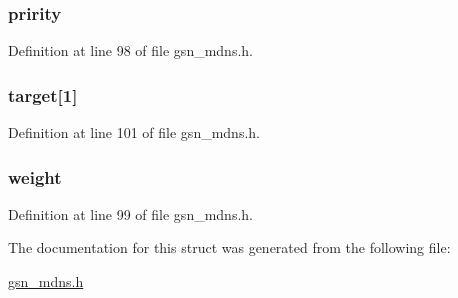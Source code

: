 \hypertarget{a00016_a0e59088092c18a68163f7fee796aaae3}{
\subsubsection[{pririty}]{ {\bf pririty}}}
\label{a00016_a0e59088092c18a68163f7fee796aaae3}


Definition at line 98 of file gsn\_\-mdns.h.

\hypertarget{a00016_a10cc4b5db91d7a9547453a566067ba1e}{
\subsubsection[{target}]{ {\bf target}\mbox{[}1\mbox{]}}}
\label{a00016_a10cc4b5db91d7a9547453a566067ba1e}


Definition at line 101 of file gsn\_\-mdns.h.

\hypertarget{a00016_ad38112381b19482ad69aec36b2a21692}{
\subsubsection[{weight}]{ {\bf weight}}}
\label{a00016_ad38112381b19482ad69aec36b2a21692}


Definition at line 99 of file gsn\_\-mdns.h.



The documentation for this struct was generated from the following file:\begin{DoxyCompactItemize}
\item 
\hyperlink{a00526}{gsn\_\-mdns.h}\end{DoxyCompactItemize}
